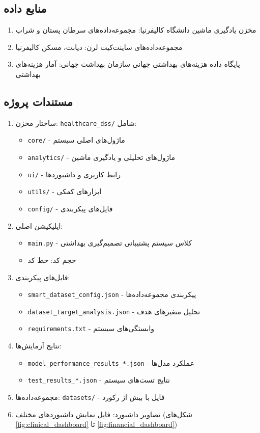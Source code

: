 \documentclass[12pt,a4paper]{article}
\begin{document}
\subsection{منابع داده}\label{subsec:data_sources}

\begin{enumerate}[topsep=0.5em, itemsep=0.8em]
\item مخزن یادگیری ماشین دانشگاه کالیفرنیا: مجموعه‌داده‌های سرطان پستان و شراب
\item مجموعه‌داده‌های ساینت‌کیت لرن: دیابت، مسکن کالیفرنیا
\item پایگاه داده هزینه‌های بهداشتی جهانی سازمان بهداشت جهانی: آمار هزینه‌های بهداشتی
\end{enumerate}

\subsection{مستندات پروژه}\label{subsec:project_documentation}

\begin{enumerate}[topsep=0.5em, itemsep=0.8em]
\item ساختار مخزن: \texttt{healthcare\_dss/} شامل:
  \begin{itemize}
  \item \texttt{core/} - ماژول‌های اصلی سیستم
  \item \texttt{analytics/} - ماژول‌های تحلیلی و یادگیری ماشین
  \item \texttt{ui/} - رابط کاربری و داشبوردها
  \item \texttt{utils/} - ابزارهای کمکی
  \item \texttt{config/} - فایل‌های پیکربندی
  \end{itemize}
\item اپلیکیشن اصلی:
  \begin{itemize}
  \item \texttt{main.py} - کلاس سیستم پشتیبانی تصمیم‌گیری بهداشتی
  \item حجم کد:  خط کد
  \end{itemize}
\item فایل‌های پیکربندی: 
  \begin{itemize}
  \item \texttt{smart\_dataset\_config.json} - پیکربندی مجموعه‌داده‌ها
  \item \texttt{dataset\_target\_analysis.json} - تحلیل متغیرهای هدف
  \item \texttt{requirements.txt} - وابستگی‌های سیستم
  \end{itemize}
\item نتایج آزمایش‌ها:
  \begin{itemize}
  \item \texttt{model\_performance\_results\_*.json} - عملکرد مدل‌ها
  \item \texttt{test\_results\_*.json} - نتایج تست‌های سیستم
  \end{itemize}
\item مجموعه‌داده‌ها: \texttt{datasets/} -  فایل با بیش از  رکورد
\item تصاویر داشبورد:  فایل نمایش داشبوردهای مختلف (شکل‌های \ref{fig:clinical_dashboard} تا \ref{fig:financial_dashboard})
\end{enumerate}
\end{document}
